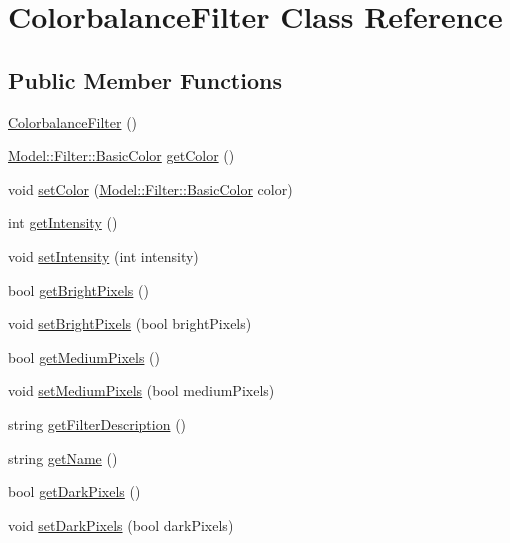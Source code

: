 \hypertarget{classModel_1_1Filter_1_1ColorbalanceFilter}{}\section{Colorbalance\+Filter Class Reference}
\label{classModel_1_1Filter_1_1ColorbalanceFilter}
\subsection*{Public Member Functions}
\begin{DoxyCompactItemize}
\item 
\hyperlink{classModel_1_1Filter_1_1ColorbalanceFilter_a3ce5da414de521fd6406561b4b0c008b}{Colorbalance\+Filter} ()
\item 
\hyperlink{namespaceModel_1_1Filter_a54742b2fc8f6a246926cbb87b7fae1a4}{Model\+::\+Filter\+::\+Basic\+Color} \hyperlink{classModel_1_1Filter_1_1ColorbalanceFilter_a82047004348409d221728e88c0b9dfa7}{get\+Color} ()
\item 
void \hyperlink{classModel_1_1Filter_1_1ColorbalanceFilter_a353ae5c263a046f9ef3b72438cfecd95}{set\+Color} (\hyperlink{namespaceModel_1_1Filter_a54742b2fc8f6a246926cbb87b7fae1a4}{Model\+::\+Filter\+::\+Basic\+Color} color)
\item 
int \hyperlink{classModel_1_1Filter_1_1ColorbalanceFilter_a708995fb1b6acb31ee0dfb0f4881e5b5}{get\+Intensity} ()
\item 
void \hyperlink{classModel_1_1Filter_1_1ColorbalanceFilter_ac8255ffbc46bb61acaa8fd23d0d260eb}{set\+Intensity} (int intensity)
\item 
bool \hyperlink{classModel_1_1Filter_1_1ColorbalanceFilter_a1be0d343ed58d5d5bf7b816da375f190}{get\+Bright\+Pixels} ()
\item 
void \hyperlink{classModel_1_1Filter_1_1ColorbalanceFilter_af0f286aa4c54fb1fd5813d02799da1cb}{set\+Bright\+Pixels} (bool bright\+Pixels)
\item 
bool \hyperlink{classModel_1_1Filter_1_1ColorbalanceFilter_a71d3e0e416aa251b66678a14b4bfa1a1}{get\+Medium\+Pixels} ()
\item 
void \hyperlink{classModel_1_1Filter_1_1ColorbalanceFilter_ab52d8f4be21efb3dbc9ef49adf755ace}{set\+Medium\+Pixels} (bool medium\+Pixels)
\item 
string \hyperlink{classModel_1_1Filter_1_1ColorbalanceFilter_a62b7b60e24f92234393b840b35808e06}{get\+Filter\+Description} ()
\item 
string \hyperlink{classModel_1_1Filter_1_1ColorbalanceFilter_a11335e13e50af74108bf926dc1340b4b}{get\+Name} ()
\item 
bool \hyperlink{classModel_1_1Filter_1_1ColorbalanceFilter_a81c4e5653e8217b741b4b183fe78abca}{get\+Dark\+Pixels} ()
\item 
void \hyperlink{classModel_1_1Filter_1_1ColorbalanceFilter_a0215d6818f471e2d3ba48b52c2c3da5d}{set\+Dark\+Pixels} (bool dark\+Pixels)
\end{DoxyCompactItemize}
